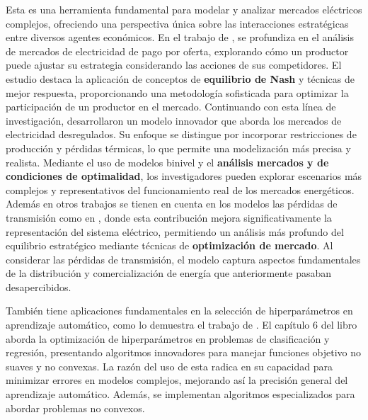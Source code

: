 Esta es una herramienta fundamental para modelar y analizar mercados eléctricos complejos, ofreciendo una perspectiva única sobre las interacciones estratégicas entre diversos agentes económicos.
En el trabajo de \cite{Aussel2017NashEI}, se profundiza en el análisis de mercados de electricidad de pago por oferta, explorando cómo un productor puede ajustar su estrategia considerando las acciones de sus competidores. El estudio destaca la aplicación de conceptos de \textbf{equilibrio de Nash} y técnicas de mejor respuesta, proporcionando una metodología sofisticada para optimizar la participación de un productor en el mercado.
Continuando con esta línea de investigación, \cite{Aussel2016DeregulatedEM} desarrollaron un modelo innovador que aborda los mercados de electricidad desregulados. Su enfoque se distingue por incorporar restricciones de producción y pérdidas térmicas, lo que permite una modelización más precisa y realista. Mediante el uso de modelos binivel y el \textbf{  análisis mercados y de condiciones de optimalidad}, los investigadores pueden explorar escenarios más complejos y representativos del funcionamiento real de los mercados energéticos.
Además en otros trabajos se tienen en cuenta en los modelos las pérdidas de transmisión como en  \cite{Aussel2013ElectricitySM}, donde esta contribución mejora significativamente la representación del sistema eléctrico, permitiendo un análisis más profundo del equilibrio estratégico mediante técnicas de \textbf{optimización de mercado}. Al considerar las pérdidas de transmisión, el modelo captura aspectos fundamentales de la distribución y comercialización de energía que anteriormente pasaban desapercibidos.

También tiene aplicaciones fundamentales en la selección de hiperparámetros en aprendizaje automático, como lo demuestra el trabajo de \cite{DempeyZemkoho2020ML}. El capítulo 6 del libro aborda la optimización de hiperparámetros en problemas de clasificación y regresión, presentando algoritmos innovadores para manejar funciones objetivo no suaves y no convexas. La razón del uso de esta radica en su capacidad para minimizar errores en modelos complejos, mejorando así la precisión general del aprendizaje automático. Además, se implementan algoritmos especializados para abordar problemas no convexos.

